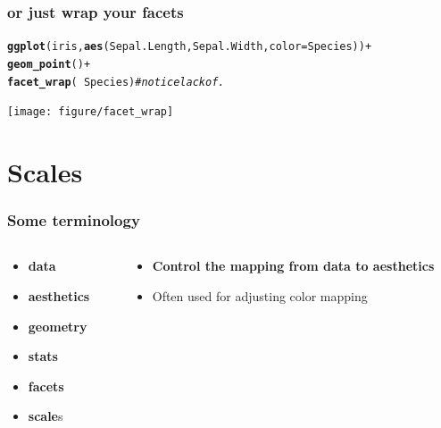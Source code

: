 \documentclass{beamer}\usepackage[]{graphicx}\usepackage[]{color}
\makeatletter
\newcommand{\hlcom}[1]{\textcolor[rgb]{0.678,0.584,0.686}{\textit{#1}}}%
\newcommand{\hlopt}[1]{\textcolor[rgb]{0,0,0}{#1}}%
\newcommand{\hlstd}[1]{\textcolor[rgb]{0.345,0.345,0.345}{#1}}%
\newcommand{\hlkwc}[1]{\textcolor[rgb]{0.333,0.667,0.333}{#1}}%
\newcommand{\hlkwd}[1]{\textcolor[rgb]{0.737,0.353,0.396}{\textbf{#1}}}%
\newenvironment{kframe}{%
 \def\at@end@of@kframe{}%
 \ifinner\ifhmode%
  \def\at@end@of@kframe{\end{minipage}}%
  \begin{minipage}{\columnwidth}%
 \fi\fi%
 \def\FrameCommand##1{\hskip\@totalleftmargin \hskip-\fboxsep
 \colorbox{shadecolor}{##1}\hskip-\fboxsep
     \hskip-\linewidth \hskip-\@totalleftmargin \hskip\columnwidth}%
 \MakeFramed {\advance\hsize-\width
   \@totalleftmargin\z@ \linewidth\hsize
   \@setminipage}}%
 {\par\unskip\endMakeFramed%
 \at@end@of@kframe}
\newenvironment{knitrout}{}{} %
\makeatother
\begin{document}
\begin{frame}[fragile]
\frametitle{or just wrap your facets}
\begin{knitrout}\footnotesize
{}\color{fgcolor}\begin{kframe}
\begin{alltt}
\hlkwd{ggplot}\hlstd{(iris,} \hlkwd{aes}\hlstd{(Sepal.Length, Sepal.Width,} \hlkwc{color} \hlstd{= Species))} \hlopt{+}
\hlkwd{geom_point}\hlstd{()} \hlopt{+}
\hlkwd{facet_wrap}\hlstd{(} \hlopt{~} \hlstd{Species)} \hlcom{# notice lack of .}
\end{alltt}
\end{kframe}

{\centering \texttt{[image: figure/facet\_wrap]} 

}



\end{knitrout}
\end{frame}


\section*{Scales}
\frame{\sectionpage}



\begin{frame}[fragile]
\frametitle{Some terminology}
\begin{columns}[t]

\begin{column}[T]{3cm}
\begin{itemize}
    \item \textbf{\color{gray}data}
    \item \textbf{\color{gray}aesthetics}
    \item \textbf{\color{gray}geometry}
    \item \textbf{\color{gray}stats}
    \item \textbf{\color{gray}facets}
    \item \textbf{scale}s
\end{itemize}
\end{column}

\begin{column}[T]{8cm}
\begin{itemize}
    \item \textbf{Control the mapping from data to aesthetics}
    \item Often used for adjusting color mapping
\end{itemize}
\end{column}

\end{columns}
\end{frame}
\end{document}
